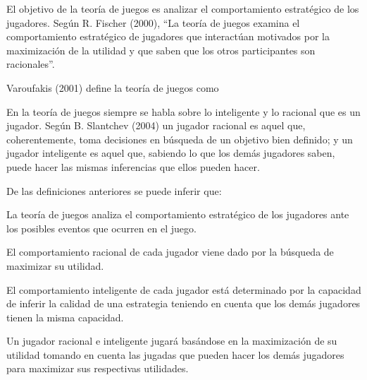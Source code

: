 	
	
	
		 El objetivo de la teoría de juegos es analizar el comportamiento estratégico de 
		los jugadores. Según R. Fischer (2000), \textquotedblleft La teoría de juegos examina el 
		comportamiento estratégico de jugadores que interactúan motivados por la 
		maximización de la utilidad y que saben que los otros participantes son racionales\textquotedblright. 
		
		 Varoufakis (2001) define la teoría de juegos como\par
		
		
		En la teoría de juegos siempre se habla sobre lo inteligente y lo racional que 
		es un jugador. Según B. Slantchev (2004) un jugador racional es aquel que, 
		coherentemente, toma decisiones en búsqueda de un objetivo bien definido; y un 
		jugador inteligente es aquel que, sabiendo lo que los demás jugadores saben, puede 
		hacer las mismas inferencias que ellos pueden hacer. 
		
		
		De las definiciones anteriores se puede inferir que: 
		\begin{enumeracion}
		\item La teoría de juegos analiza el comportamiento estratégico de los jugadores ante 
		los posibles eventos que ocurren en el juego. 
		\item  El comportamiento racional de cada jugador viene dado por la búsqueda de 
		maximizar su utilidad. 
		\item  El comportamiento inteligente de cada jugador está determinado por la capacidad 
		de inferir la calidad de una estrategia teniendo en cuenta que los demás jugadores 
		tienen la misma capacidad. 
		\item  Un jugador racional e inteligente jugará basándose en la maximización de su 
		utilidad tomando en cuenta las jugadas que pueden hacer los demás jugadores 
		para maximizar sus respectivas utilidades. 
		\end{enumeracion}
		
